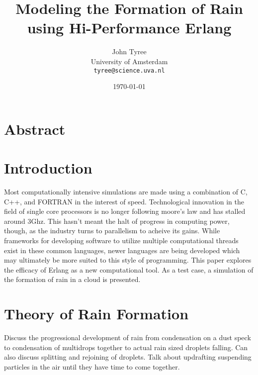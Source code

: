 \documentclass[twocolumn,a4paper,10pt]{article}
\title{Modeling the Formation of Rain using Hi-Performance Erlang}
\author{John Tyree\\
University of Amsterdam\\
\texttt{tyree@science.uva.nl}}
\date{\today}
\begin{document}
\maketitle
\section{Abstract}
\section{Introduction}
Most computationally intensive simulations are made using a combination of C,
C++, and FORTRAN in the interest of speed. Technological innovation in the field
of single core processors is no longer following moore's law and has stalled
around 3Ghz. This hasn't meant the halt of progress in computing power, though,
as the industry turns to parallelism to acheive its gains. While frameworks
for developing software to utilize multiple computational threads exist in these
common languages, newer languages are being developed which may ultimately be
more suited to this style of programming. This paper explores the efficacy of
Erlang as a new computational tool. As a test case, a simulation of the
formation of rain in a cloud is presented.

\section{Theory of Rain Formation}
Discuss the progressional development of rain from condensation on a dust speck
to condensation of multidrops together to actual rain sized droplets falling.
Can also discuss splitting and rejoining of droplets. Talk about updrafting
suspending particles in the air until they have time to come together.
\end{document}
